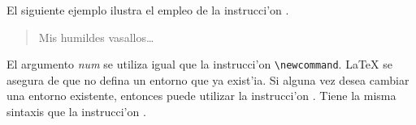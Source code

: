 El siguiente ejemplo ilustra el empleo de la instrucci'on
.

\begin{source}
\newenvironment{king}
    {\begin{quote}}{\end{quote}}
\begin{king}
Mis humildes vasallos\ldots
\end{king}
\end{source}

El argumento \emph{num} se utiliza igual que la instrucci'on
\verb|\newcommand|. \LaTeX{} se asegura de que no defina un entorno
que ya exist'ia. Si alguna vez desea cambiar una entorno existente,
entonces puede utilizar la instrucci'on . Tiene
la misma sintaxis que la instrucci'on .


